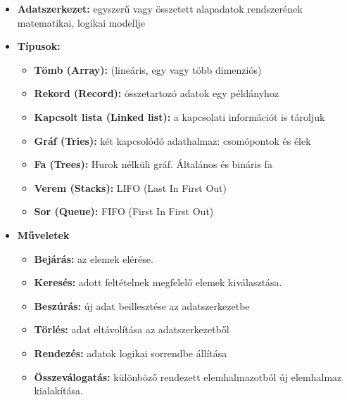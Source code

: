 \documentclass[11pt,a4paper]{article}
\begin{document}
            \begin{tcolorbox}[colback=blue!5!white,colframe=blue!50!black,title= 16. Ismertesse az alapvető adatszerkezet típusokat és ezek műveleteit!]
                \begin{itemize}
                    \item \textbf{Adatszerkezet:} egyszerű vagy összetett alapadatok rendszerének matematikai, logikai modellje
                    \item \textbf{Típusok:}
                    \begin{itemize}
                        \item \textbf{Tömb (Array):} (lineáris, egy vagy több dimenziós)
                        \item \textbf{Rekord (Record):} összetartozó adatok egy példányhoz
                        \item \textbf{Kapcsolt lista (Linked list):} a kapcsolati információt is tároljuk
                        \item \textbf{Gráf (Tries):} két kapcsolódó adathalmaz: csomópontok és élek
                        \item \textbf{Fa (Trees):} Hurok nélküli gráf. Általános és bináris fa
                        \item \textbf{Verem (Stacks):} LIFO (Last In First Out)
                        \item \textbf{Sor (Queue):} FIFO (First In First Out)
                    \end{itemize}
                    \item \textbf{Műveletek}
                    \begin{itemize}
                        \item \textbf{Bejárás:} az elemek elérése.
                        \item \textbf{Keresés:} adott feltételnek megfelelő elemek kiválasztása.
                        \item \textbf{Beszúrás:} új adat beillesztése az adatszerkezetbe
                        \item \textbf{Törlés:} adat eltávolítása az adatszerkezetből
                        \item \textbf{Rendezés:} adatok logikai sorrendbe állítása
                        \item \textbf{Összeválogatás:} különböző rendezett elemhalmazotból új elemhalmaz kialakítása.
                    \end{itemize}

\end{itemize}
\end{tcolorbox}
\end{document}
